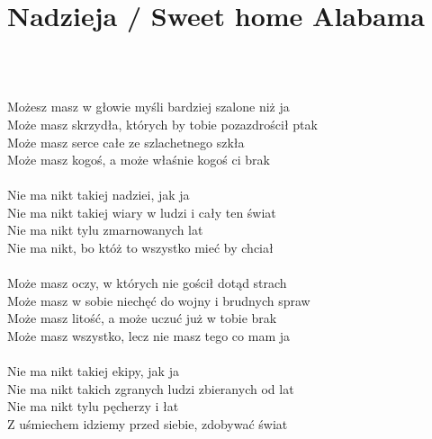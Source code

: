 \documentclass[a5paper, 10pt]{book}
\begin{document}
\section{Nadzieja / Sweet home Alabama}~\\~\\
\begin{minipage}[t]{0.8\textwidth}
Możesz masz w głowie myśli bardziej szalone niż ja\\
Może masz skrzydła, których by tobie pozazdrościł ptak\\
Może masz serce całe ze szlachetnego szkła\\
Może masz kogoś, a może właśnie kogoś ci brak\\
\\
\hspace*{5mm}Nie ma nikt takiej nadziei, jak ja\\
\hspace*{5mm}Nie ma nikt takiej wiary w ludzi i cały ten świat\\
\hspace*{5mm}Nie ma nikt tylu zmarnowanych lat\\
\hspace*{5mm}Nie ma nikt, bo któż to wszystko mieć by chciał\\
\\
Może masz oczy, w których nie gościł dotąd strach\\
Może masz w sobie niechęć do wojny i brudnych spraw\\
Może masz litość, a może uczuć już w tobie brak\\
Może masz wszystko, lecz nie masz tego co mam ja\\
\\
\hspace*{5mm}Nie ma nikt takiej ekipy, jak ja\\
\hspace*{5mm}Nie ma nikt takich zgranych ludzi zbieranych od lat\\
\hspace*{5mm}Nie ma nikt tylu pęcherzy i łat\\
\hspace*{5mm}Z uśmiechem idziemy przed siebie, zdobywać świat\\


\end{minipage}
\end{document}
